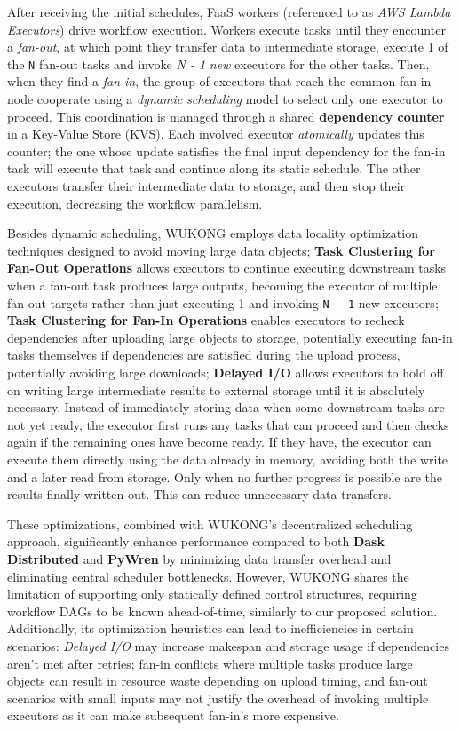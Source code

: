 \documentclass[conference]{IEEEtran}
\begin{document}
After receiving the initial schedules, FaaS workers (referenced to as \textit{AWS Lambda Executors}) drive workflow execution. Workers execute tasks until they encounter a \textit{fan-out}, at which point they transfer data to intermediate storage, execute 1 of the \texttt{N} fan-out tasks and invoke \textit{N - 1} \textit{new} executors for the other tasks. Then, when they find a \textit{fan-in}, the group of executors that reach the common fan-in node cooperate using a \textit{dynamic scheduling} model to select only one executor to proceed. This coordination is managed through a shared \textbf{dependency counter} in a Key-Value Store (KVS). Each involved executor \textit{atomically} updates this counter; the one whose update satisfies the final input dependency for the fan-in task will execute that task and continue along its static schedule. The other executors transfer their intermediate data to storage, and then stop their execution, decreasing the workflow parallelism.

Besides dynamic scheduling, WUKONG employs data locality optimization techniques designed to avoid moving large data objects; \textbf{Task Clustering for Fan-Out Operations} allows executors to continue executing downstream tasks when a fan-out task produces large outputs, becoming the executor of multiple fan-out targets rather than just executing 1 and invoking \texttt{N - 1} new executors; \textbf{Task Clustering for Fan-In Operations} enables executors to recheck dependencies after uploading large objects to storage, potentially executing fan-in tasks themselves if dependencies are satisfied during the upload process, potentially avoiding large downloads; \textbf{Delayed I/O} allows executors to hold off on writing large intermediate results to external storage until it is absolutely necessary. Instead of immediately storing data when some downstream tasks are not yet ready, the executor first runs any tasks that can proceed and then checks again if the remaining ones have become ready. If they have, the executor can execute them directly using the data already in memory, avoiding both the write and a later read from storage. Only when no further progress is possible are the results finally written out. This can reduce unnecessary data transfers.

These optimizations, combined with WUKONG's decentralized scheduling approach, significantly enhance performance compared to both \textbf{Dask Distributed} and \textbf{PyWren} by minimizing data transfer overhead and eliminating central scheduler bottlenecks. However, WUKONG shares the limitation of supporting only statically defined control structures, requiring workflow DAGs to be known ahead-of-time, similarly to our proposed solution. Additionally, its optimization heuristics can lead to inefficiencies in certain scenarios: \textit{Delayed I/O} may increase makespan and storage usage if dependencies aren't met after retries; fan-in conflicts where multiple tasks produce large objects can result in resource waste depending on upload timing, and fan-out scenarios with small inputs may not justify the overhead of invoking multiple executors as it can make subsequent fan-in's more expensive.
\end{document}

